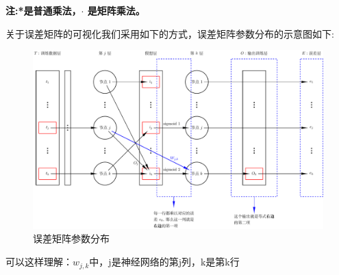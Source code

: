 \documentclass[12pt]{article}
\begin{document}
    \textbf{注:*是普通乘法，$\cdot$ 是矩阵乘法。}

    \clearpage
    关于误差矩阵的可视化我们采用如下的方式，误差矩阵参数分布的示意图如下:
    \begin{figure}[!htb]
        \centering
        \includegraphics[scale=.5]{./picture/coef.pdf}
        \caption{误差矩阵参数分布}
    \end{figure}

    可以这样理解：$w_{j,k}$中，j是神经网络的第j列，k是第k行
   
\end{document}
